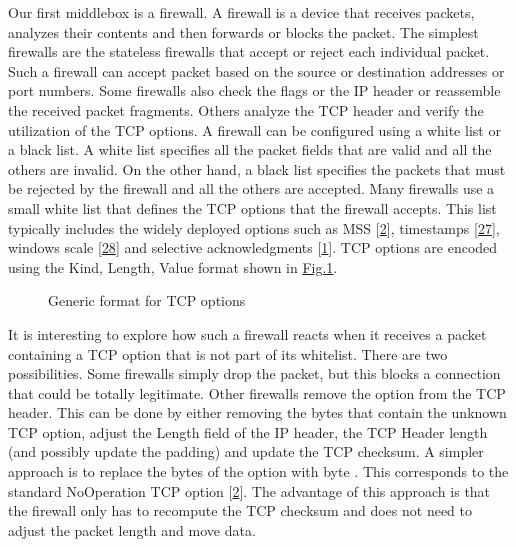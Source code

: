 \documentclass[letterpaper,10pt,english]{sphinxmanual}
\begin{document}
\sphinxAtStartPar
Our first middlebox is a firewall. A firewall is a device that receives packets, analyzes their contents and then forwards or blocks the packet. The simplest firewalls are the stateless firewalls that accept or reject each individual packet. Such a firewall can accept packet based on the source or destination addresses or port numbers. Some firewalls also check the flags or the IP header or reassemble the received packet fragments. Others analyze the TCP header and verify the utilization of the TCP options. A firewall can be configured using a white list or a black list. A white list specifies all the packet fields that are valid and all the others are invalid. On the other hand, a black list specifies the packets that must be rejected by the firewall and all the others are accepted. Many firewalls use a small white list that defines the TCP options that the firewall accepts. This list typically includes the widely deployed options such as MSS {[}\hyperlink{cite.biblio:id729}{2}{]}, timestamps {[}\hyperlink{cite.biblio:id7140}{27}{]}, windows scale {[}\hyperlink{cite.biblio:id1245}{28}{]} and selective acknowledgments {[}\hyperlink{cite.biblio:id1948}{1}{]}. TCP options are encoded using the Kind, Length, Value format shown in \hyperref[\detokenize{mptcp:fig-mptcp-tcp-option}]{Fig.\@ \ref{\detokenize{mptcp:fig-mptcp-tcp-option}}}.
\begin{figure}[htbp]\centering\capstart{}\caption{Generic format for TCP options}\label{\detokenize{mptcp:id76}}\label{\detokenize{mptcp:fig-mptcp-tcp-option}}\end{figure}
\sphinxAtStartPar
It is interesting to explore how such a firewall reacts when it receives a packet containing a TCP option that is not part of its whitelist. There are two possibilities. Some firewalls simply drop the packet, but this blocks a connection that could be totally legitimate. Other firewalls remove the option from the TCP header. This can be done by either removing the bytes that contain the unknown TCP option, adjust the Length field of the IP header, the TCP Header length (and possibly update the padding) and update the TCP checksum. A simpler approach is to replace the bytes of the option with byte . This corresponds to the standard No\sphinxhyphen{}Operation TCP option {[}\hyperlink{cite.biblio:id729}{2}{]}. The advantage of this approach is that the firewall only has to recompute the TCP checksum and does not need to adjust the packet length and move data.
\end{document}
